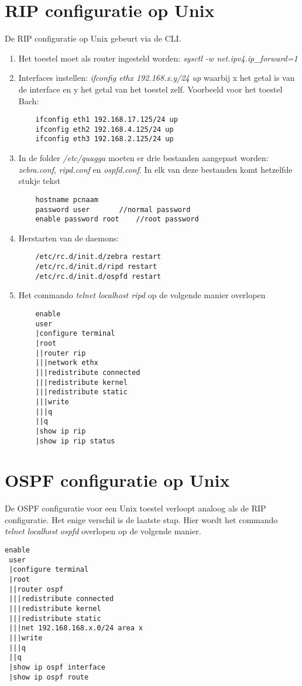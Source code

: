 \documentclass{report}
\begin{document}
\section{RIP configuratie op Unix}
De RIP configuratie op Unix gebeurt via de CLI.
\begin{enumerate}
	\item Het toestel moet als router ingesteld worden: \textit{sysctl -w net.ipv4.ip\_forward=1}
	\item Interfaces instellen: \textit{ifconfig ethx 192.168.x.y/24 up} waarbij x het getal is van de interface en y het getal van het toestel zelf. Voorbeeld voor het toestel Bach:
	\begin{lstlisting}
	ifconfig eth1 192.168.17.125/24 up
	ifconfig eth2 192.168.4.125/24 up
	ifconfig eth3 192.168.2.125/24 up
	\end{lstlisting}
	\item In de folder \textit{/etc/quagga} moeten er drie bestanden aangepast worden: \textit{zebra.conf}, \textit{ripd.conf} en \textit{ospfd.conf}. In elk van deze bestanden komt hetzelfde stukje tekst
	\begin{lstlisting}
	hostname pcnaam
	password user		//normal password
	enable password root	//root password
	\end{lstlisting}
	\item Herstarten van de daemons:
	\begin{lstlisting}
	/etc/rc.d/init.d/zebra restart
	/etc/rc.d/init.d/ripd restart
	/etc/rc.d/init.d/ospfd restart
	\end{lstlisting}
	
	\item Het commando \textit{telnet localhost ripd} op de volgende manier overlopen
	\begin{lstlisting}
	enable
	user
	|configure terminal
	|root
	||router rip
	|||network ethx
	|||redistribute connected
 	|||redistribute kernel
 	|||redistribute static
	|||write
	|||q
	||q
	|show ip rip
	|show ip rip status
	\end{lstlisting}
\end{enumerate}

\section{OSPF configuratie op Unix}
De OSPF configuratie voor een Unix toestel verloopt analoog als de RIP configuratie. Het enige verschil is de laatste stap. Hier wordt het commando \textit{telnet localhost ospfd} overlopen op de volgende manier.
\begin{lstlisting}
enable
 user
 |configure terminal
 |root
 ||router ospf
 |||redistribute connected
 |||redistribute kernel
 |||redistribute static
 |||net 192.168.168.x.0/24 area x
 |||write
 |||q
 ||q
 |show ip ospf interface
 |show ip ospf route
\end{lstlisting}
\end{document}
